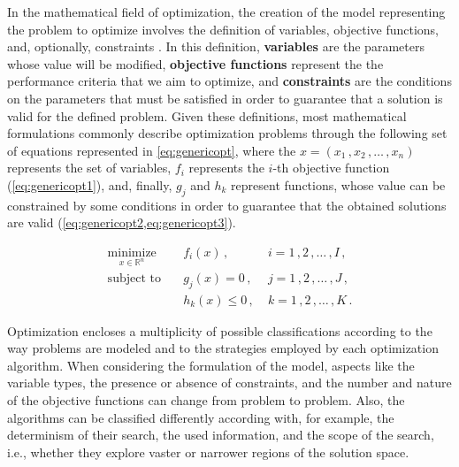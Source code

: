 	
In the mathematical field of optimization, the creation of the model representing the problem to optimize involves the definition of variables, objective functions, and, optionally, constraints \cite{Nocedal2011NumericalOptimization}. In this definition, \textbf{variables} are the parameters whose value will be modified, \textbf{objective functions} represent the the performance criteria that we aim to optimize, and \textbf{constraints} are the conditions on the parameters that must be satisfied in order to guarantee that a solution is valid for the defined problem. Given these definitions, most mathematical formulations commonly describe optimization problems through the following set of equations represented in \cref{eq:genericopt}\cite{Koziel2011}, where the $x = (x_1\,, x_2\,, \ldots\,, x_n)$ represents the set of variables, $f_i$ represents the $i$-th objective function (\cref{eq:genericopt1}), and, finally, $g_j$ and $h_k$ represent functions, whose value can be constrained by some conditions in order to guarantee that the obtained solutions are valid (\cref{eq:genericopt2,eq:genericopt3}). 
	
	\begin{subequations}
		\label{eq:genericopt}
		\begin{align}
		\underset{x \in \mathbb{R}^n}{\text{minimize}}
		& \quad f_i(x)\,, &\; i = 1\,, 2\,, \ldots\,, I\,, 
		\label{eq:genericopt1}\\
		\text{subject to}
		& \quad g_j(x) = 0\,, &\; j = 1\,, 2\,, \ldots\,, J\,, \label{eq:genericopt2}\\ 
		& \quad h_k(x) \leq 0\,, &\; k = 1\,, 2\,, \ldots\,, K\,.  \label{eq:genericopt3}
		\end{align}
	\end{subequations}
	
	Optimization encloses a multiplicity of possible classifications according to the way problems are modeled and to the strategies employed by each optimization algorithm. When considering the formulation of the model, aspects like the variable types, the presence or absence of constraints, and the number and nature of the objective functions can change from problem to problem. Also, the algorithms can be classified differently according with, for example, the determinism of their search, the used information, and the scope of the search, i.e., whether they explore vaster or narrower regions of the solution space. 
	
